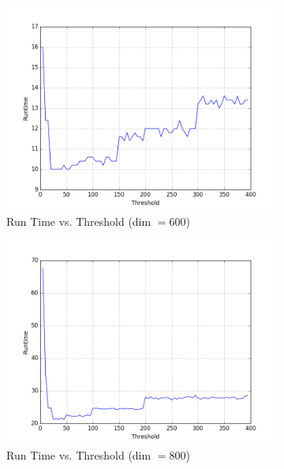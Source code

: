 \documentclass[12pt]{article}
\begin{document}
\begin{figure}
\centering
\begin{subfigure}{.5\textwidth}
  \centering
  \includegraphics[width=\linewidth]{data/d600.png}
  \caption{Run Time vs. Threshold (dim $= 600$)}
  \label{fig:sub1}
\end{subfigure}%
\begin{subfigure}{.5\textwidth}
  \centering
  \includegraphics[width=\linewidth]{data/d800.png}
  \caption{Run Time vs. Threshold (dim $= 800$)}
  \label{fig:sub2}
\end{subfigure} \\ %
\bigskip
\begin{subfigure}{.5\textwidth}
  \centering

\end{subfigure}
\end{figure}
\end{document}
